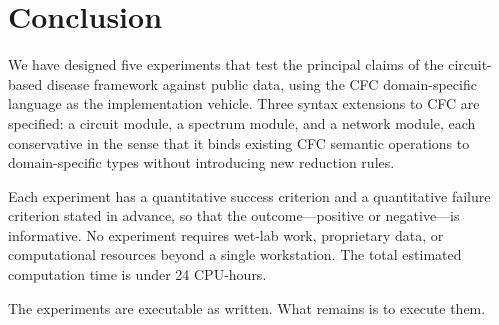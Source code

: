 \documentclass[11pt,a4paper]{article}
\theoremstyle{expthm}
\theoremstyle{definition}
\theoremstyle{remark}
\begin{document}
\section{Conclusion}
\label{sec:conclusion}

We have designed five experiments that test the principal claims of the
circuit-based disease framework against public data, using the CFC
domain-specific language as the implementation vehicle. Three syntax
extensions to CFC are specified: a circuit module, a spectrum module, and
a network module, each conservative in the sense that it binds existing
CFC semantic operations to domain-specific types without introducing new
reduction rules.

Each experiment has a quantitative success criterion and a quantitative
failure criterion stated in advance, so that the outcome---positive or
negative---is informative. No experiment requires wet-lab work,
proprietary data, or computational resources beyond a single workstation.
The total estimated computation time is under 24 CPU-hours.

The experiments are executable as written. What remains is to execute
them.



\end{document}
